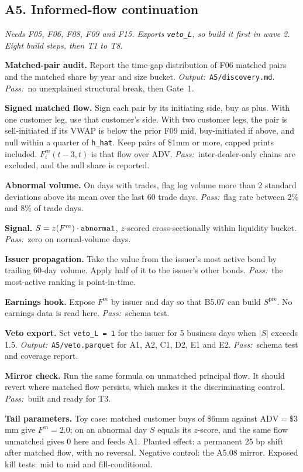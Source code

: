 \documentclass[11pt,letterpaper]{article}
\makeatletter
\newcommand{\code}[1]{\texttt{#1}}
\newcommand{\ADV}{\mathrm{ADV}}
\newcommand*{\twodigit}[1]{\expandafter\@twodigit\csname c@#1\endcsname}
\newcommand*{\@twodigit}[1]{\ifnum#1<10 0\fi\number#1}
\newcommand{\stepname}[1]{\textbf{#1.}}
\newcommand{\Out}{\textit{Output:}~}
\newcommand{\Pass}{\textit{Pass:}~}
\makeatother
\begin{document}
\subsection{A5. Informed-flow continuation}
\emph{Needs F05, F06, F08, F09 and F15. Exports \code{veto_L}, so build it first in wave 2. Eight build steps, then T1 to T8.}
\begin{ladder}[label=\textbf{A5.\twodigit*}]
\item \stepname{Matched-pair audit} Report the time-gap distribution of F06 matched pairs and the matched share by year and size bucket. \Out \code{A5/discovery.md}. \Pass no unexplained structural break, then Gate~1.
\item \stepname{Signed matched flow} Sign each pair by its initiating side, buy as plus. With one customer leg, use that customer's side. With two customer legs, the pair is sell-initiated if its VWAP is below the prior F09 mid, buy-initiated if above, and null within a quarter of \code{h_hat}. Keep pairs of \$1mm or more, capped prints included. $F^{m}_i(t-3,t)$ is that flow over ADV. \Pass inter-dealer-only chains are excluded, and the null share is reported.
\item \stepname{Abnormal volume} On days with trades, flag log volume more than 2 standard deviations above its mean over the last 60 trade days. \Pass flag rate between 2\% and 8\% of trade days.
\item \stepname{Signal} $S=z(F^{m})\cdot\text{\code{abnormal}}$, $z$-scored cross-sectionally within liquidity bucket. \Pass zero on normal-volume days.
\item \stepname{Issuer propagation} Take the value from the issuer's most active bond by trailing 60-day volume. Apply half of it to the issuer's other bonds. \Pass the most-active ranking is point-in-time.
\item \stepname{Earnings hook} Expose $F^{m}$ by issuer and day so that B5.07 can build $S^{\mathrm{pre}}$. No earnings data is read here. \Pass schema test.
\item \stepname{Veto export} Set \code{veto_L = 1} for the issuer for 5 business days when $|S|$ exceeds 1.5. \Out \code{A5/veto.parquet} for A1, A2, C1, D2, E1 and E2. \Pass schema test and coverage report.
\item \stepname{Mirror check} Run the same formula on unmatched principal flow. It should revert where matched flow persists, which makes it the discriminating control. \Pass built and ready for T3.
\end{ladder}
\textbf{Tail parameters.} Toy case: matched customer buys of \$6mm against $\ADV=\$3$mm give $F^{m}=2.0$; on an abnormal day $S$ equals its $z$-score, and the same flow unmatched gives 0 here and feeds A1. Planted effect: a permanent 25 bp shift after matched flow, with no reversal. Negative control: the A5.08 mirror. Exposed kill tests: mid to mid and fill-conditional.
\end{document}
